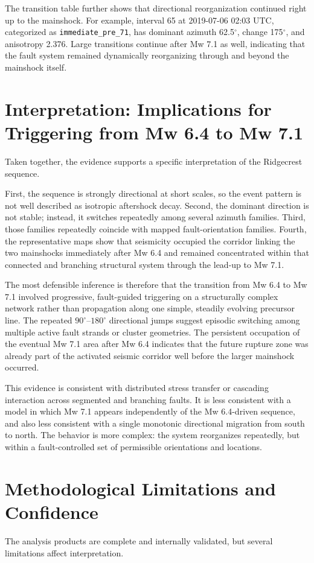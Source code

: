 \documentclass[11pt]{article}
\begin{document}
The transition table further shows that directional reorganization continued right up to the mainshock. For example, interval 65 at 2019-07-06 02:03 UTC, categorized as \texttt{immediate\_pre\_71}, has dominant azimuth 62.5$^{\circ}$, change 175$^{\circ}$, and anisotropy 2.376. Large transitions continue after Mw 7.1 as well, indicating that the fault system remained dynamically reorganizing through and beyond the mainshock itself.

\section{Interpretation: Implications for Triggering from Mw 6.4 to Mw 7.1}
Taken together, the evidence supports a specific interpretation of the Ridgecrest sequence.

First, the sequence is strongly directional at short scales, so the event pattern is not well described as isotropic aftershock decay. Second, the dominant direction is not stable; instead, it switches repeatedly among several azimuth families. Third, those families repeatedly coincide with mapped fault-orientation families. Fourth, the representative maps show that seismicity occupied the corridor linking the two mainshocks immediately after Mw 6.4 and remained concentrated within that connected and branching structural system through the lead-up to Mw 7.1.

The most defensible inference is therefore that the transition from Mw 6.4 to Mw 7.1 involved progressive, fault-guided triggering on a structurally complex network rather than propagation along one simple, steadily evolving precursor line. The repeated $90^{\circ}$--$180^{\circ}$ directional jumps suggest episodic switching among multiple active fault strands or cluster geometries. The persistent occupation of the eventual Mw 7.1 area after Mw 6.4 indicates that the future rupture zone was already part of the activated seismic corridor well before the larger mainshock occurred.

This evidence is consistent with distributed stress transfer or cascading interaction across segmented and branching faults. It is less consistent with a model in which Mw 7.1 appears independently of the Mw 6.4-driven sequence, and also less consistent with a single monotonic directional migration from south to north. The behavior is more complex: the system reorganizes repeatedly, but within a fault-controlled set of permissible orientations and locations.

\section{Methodological Limitations and Confidence}
The analysis products are complete and internally validated, but several limitations affect interpretation.
\end{document}
